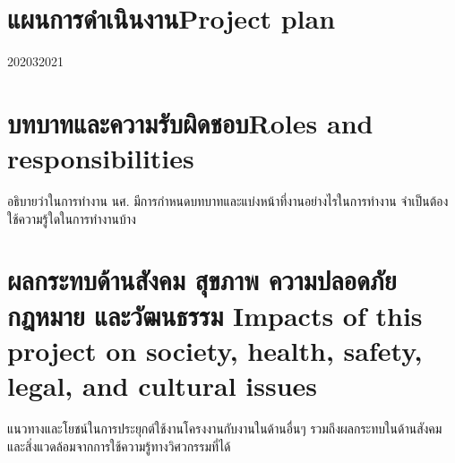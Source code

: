 \section{\ifcpe แผนการดำเนินงาน\else Project plan\fi}

\begin{plan}{7}{2020}{3}{2021}
\end{plan}

\section{\ifcpe บทบาทและความรับผิดชอบ\else Roles and responsibilities\fi}
อธิบายว่าในการทำงาน นศ. มีการกำหนดบทบาทและแบ่งหน้าที่งานอย่างไรในการทำงาน จำเป็นต้องใช้ความรู้ใดในการทำงานบ้าง

\section{\ifcpe%
ผลกระทบด้านสังคม สุขภาพ ความปลอดภัย กฎหมาย และวัฒนธรรม
\else%
Impacts of this project on society, health, safety, legal, and cultural issues
\fi}

แนวทางและโยชน์ในการประยุกต์ใช้งานโครงงานกับงานในด้านอื่นๆ รวมถึงผลกระทบในด้านสังคมและสิ่งแวดล้อมจากการใช้ความรู้ทางวิศวกรรมที่ได้
